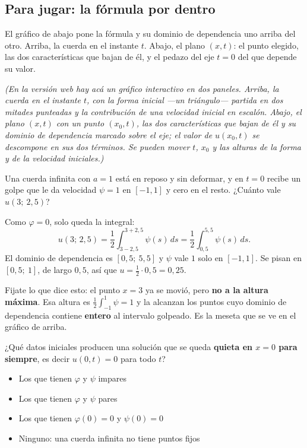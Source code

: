 \documentclass[
  spanish,
  a4paper,
]{scrbook}
\providecommand{\tightlist}{%
  \setlength{\itemsep}{0pt}\setlength{\parskip}{0pt}}
\theoremstyle{definition}
\theoremstyle{plain}
\theoremstyle{definition}
\theoremstyle{plain}
\theoremstyle{definition}
\theoremstyle{remark}
\begin{document}
\subsection{Para jugar: la fórmula por
dentro}\label{sec-hip-lienzo-dalembert}

El gráfico de abajo pone la fórmula y su dominio de dependencia uno
arriba del otro. Arriba, la cuerda en el instante \(t\). Abajo, el plano
\((x,t)\): el punto elegido, las dos características que bajan de él, y
el pedazo del eje \(t=0\) del que depende su valor.

\emph{(En la versión web hay acá un gráfico interactivo en dos paneles.
Arriba, la cuerda en el instante \(t\), con la forma inicial ---un
triángulo--- partida en dos mitades punteadas y la contribución de una
velocidad inicial en escalón. Abajo, el plano \((x,t)\) con un punto
\((x_0,t)\), las dos características que bajan de él y su dominio de
dependencia marcado sobre el eje; el valor de \(u(x_0,t)\) se descompone
en sus dos términos. Se pueden mover \(t\), \(x_0\) y las alturas de la
forma y de la velocidad iniciales.)}

Una cuerda infinita con \(a = 1\) está en reposo y sin deformar, y en
\(t=0\) recibe un golpe que le da velocidad \(\psi = 1\) en \([-1, 1]\)
y cero en el resto. ¿Cuánto vale \(u(3;\ 2{,}5)\)?

Como \(\varphi = 0\), solo queda la integral:
\[u(3;\,2{,}5) = \frac12\int_{3-2{,}5}^{3+2{,}5}\psi(s)\,ds = \frac12\int_{0{,}5}^{5{,}5}\psi(s)\,ds .\]
El dominio de dependencia es \([0{,}5;\ 5{,}5]\) y \(\psi\) vale \(1\)
solo en \([-1,1]\). Se pisan en \([0{,}5;\ 1]\), de largo \(0{,}5\), así
que \(u = \tfrac12\cdot 0{,}5 = 0{,}25\).

Fijate lo que dice esto: el punto \(x=3\) ya se movió, pero \textbf{no a
la altura máxima}. Esa altura es \(\tfrac12\int_{-1}^1\psi = 1\) y la
alcanzan los puntos cuyo dominio de dependencia contiene \textbf{entero}
al intervalo golpeado. Es la meseta que se ve en el gráfico de arriba.

¿Qué datos iniciales producen una solución que se queda \textbf{quieta
en \(x=0\) para siempre}, es decir \(u(0,t) = 0\) para todo \(t\)?

\begin{itemize}
\tightlist
\item
  {Los que tienen \(\varphi\) y \(\psi\) impares}
\item
  {Los que tienen \(\varphi\) y \(\psi\) pares}
\item
  {Los que tienen \(\varphi(0) = 0\) y \(\psi(0) = 0\)}
\item
  {Ninguno: una cuerda infinita no tiene puntos fijos}
\end{itemize}
\end{document}

